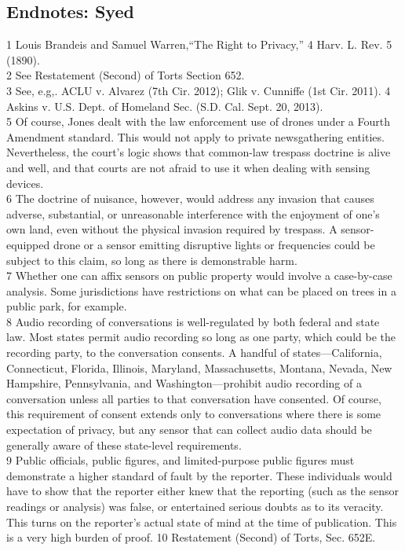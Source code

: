 \begin{itemize}
\section{Endnotes: Syed}
1 Louis Brandeis and Samuel Warren,``The Right to Privacy,'' 4 Harv. L. Rev. 5 (1890).\\
2 See Restatement (Second) of Torts Section 652.\\
3 See, e.g,. ACLU v. Alvarez (7th Cir. 2012); Glik v. Cunniffe (1st Cir. 2011).
4 Askins v. U.S. Dept. of Homeland Sec. (S.D. Cal. Sept. 20, 2013).\\
5 Of course, Jones dealt with the law enforcement use of drones under a Fourth Amendment
standard. This would not apply to private newsgathering entities. Nevertheless, the court's logic
shows that common-law trespass doctrine is alive and well, and that courts are not afraid to use it
when dealing with sensing devices.\\
6 The doctrine of nuisance, however, would address any invasion that causes adverse, substantial,
or unreasonable interference with the enjoyment of one's own land, even without the physical
invasion required by trespass. A sensor-equipped drone or a sensor emitting disruptive lights or
frequencies could be subject to this claim, so long as there is demonstrable harm.\\
7 Whether one can affix sensors on public property would involve a case-by-case analysis.
Some jurisdictions have restrictions on what can be placed on trees in a public park, for example.\\
8 Audio recording of conversations is well-regulated by both federal and state law. Most states
permit audio recording so long as one party, which could be the recording party, to the
conversation consents. A handful of states—California, Connecticut, Florida, Illinois, Maryland,
Massachusetts, Montana, Nevada, New Hampshire, Pennsylvania, and Washington—prohibit
audio recording of a conversation unless all parties to that conversation have consented.
Of course, this requirement of consent extends only to conversations where there is some
expectation of privacy, but any sensor that can collect audio data should be generally aware of
these state-level requirements.\\
9 Public officials, public figures, and limited-purpose public figures must demonstrate a higher
standard of fault by the reporter. These individuals would have to show that the reporter either
knew that the reporting (such as the sensor readings or analysis) was false, or entertained
serious doubts as to its veracity. This turns on the reporter's actual state of mind at the time of publication. This is a very high burden of proof.
10 Restatement (Second) of Torts, Sec. 652E.\\


\end{itemize}
